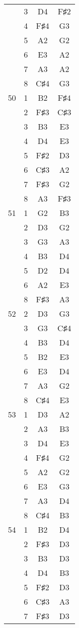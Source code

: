 \documentclass{article}
\begin{document}
\begin{longtable}{|c|c|c|c|}
  & 3 & D4 & F♯2 \\ 
  & 4 & F♯4 & G3 \\ 
  & 5 & A2 & G2 \\ 
  & 6 & E3 & A2 \\ 
  & 7 & A3 & A2 \\ 
  & 8 & C♯4 & G3 \\ 
\hline
50 & 1 & B2 & F♯4 \\ 
  & 2 & F♯3 & C♯3 \\ 
  & 3 & B3 & E3 \\ 
  & 4 & D4 & E3 \\ 
  & 5 & F♯2 & D3 \\ 
  & 6 & C♯3 & A2 \\ 
  & 7 & F♯3 & G2 \\ 
  & 8 & A3 & F♯3 \\ 
\hline
51 & 1 & G2 & B3 \\ 
  & 2 & D3 & G2 \\ 
  & 3 & G3 & A3 \\ 
  & 4 & B3 & D4 \\ 
  & 5 & D2 & D4 \\ 
  & 6 & A2 & E3 \\ 
  & 8 & F♯3 & A3 \\ 
\hline
52 & 2 & D3 & G3 \\ 
  & 3 & G3 & C♯4 \\ 
  & 4 & B3 & D4 \\ 
  & 5 & B2 & E3 \\ 
  & 6 & E3 & D4 \\ 
  & 7 & A3 & G2 \\ 
  & 8 & C♯4 & E3 \\ 
\hline
53 & 1 & D3 & A2 \\ 
  & 2 & A3 & B3 \\ 
  & 3 & D4 & E3 \\ 
  & 4 & F♯4 & G2 \\ 
  & 5 & A2 & G2 \\ 
  & 6 & E3 & G3 \\ 
  & 7 & A3 & D4 \\ 
  & 8 & C♯4 & B3 \\ 
\hline
54 & 1 & B2 & D4 \\ 
  & 2 & F♯3 & D3 \\ 
  & 3 & B3 & D3 \\ 
  & 4 & D4 & B3 \\ 
  & 5 & F♯2 & D3 \\ 
  & 6 & C♯3 & A3 \\ 
  & 7 & F♯3 & D3 \\ 

\end{longtable}
\end{document}
